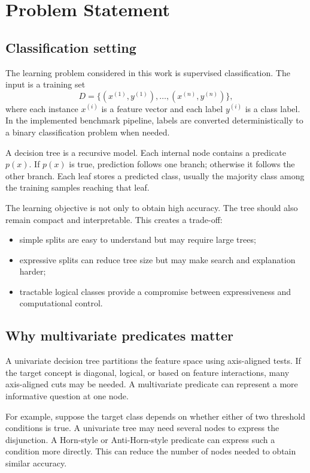 \documentclass[11pt,a4paper]{article}
\begin{document}
\section{Problem Statement}

\subsection{Classification setting}

The learning problem considered in this work is supervised classification. The input is a training set
\[
    D = \{(x^{(1)}, y^{(1)}), \ldots, (x^{(n)}, y^{(n)})\},
\]
where each instance $x^{(i)}$ is a feature vector and each label $y^{(i)}$ is a class label. In the implemented benchmark pipeline, labels are converted deterministically to a binary classification problem when needed.

A decision tree is a recursive model. Each internal node contains a predicate $p(x)$. If $p(x)$ is true, prediction follows one branch; otherwise it follows the other branch. Each leaf stores a predicted class, usually the majority class among the training samples reaching that leaf.

The learning objective is not only to obtain high accuracy. The tree should also remain compact and interpretable. This creates a trade-off:
\begin{itemize}
    \item simple splits are easy to understand but may require large trees;
    \item expressive splits can reduce tree size but may make search and explanation harder;
    \item tractable logical classes provide a compromise between expressiveness and computational control.
\end{itemize}

\subsection{Why multivariate predicates matter}

A univariate decision tree partitions the feature space using axis-aligned tests. If the target concept is diagonal, logical, or based on feature interactions, many axis-aligned cuts may be needed. A multivariate predicate can represent a more informative question at one node.

For example, suppose the target class depends on whether either of two threshold conditions is true. A univariate tree may need several nodes to express the disjunction. A Horn-style or Anti-Horn-style predicate can express such a condition more directly. This can reduce the number of nodes needed to obtain similar accuracy.
\end{document}
